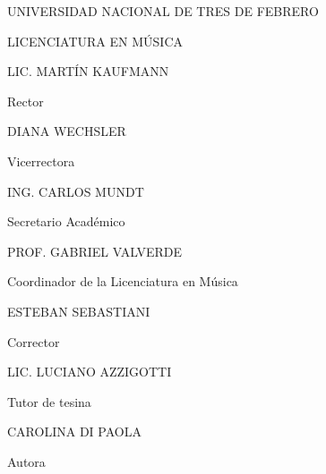 UNIVERSIDAD NACIONAL DE TRES DE FEBRERO 

LICENCIATURA EN MÚSICA 


LIC. MARTÍN KAUFMANN 

Rector 

DIANA WECHSLER 

Vicerrectora 

ING. CARLOS MUNDT 

Secretario Académico 

PROF. GABRIEL VALVERDE 

Coordinador de la Licenciatura en Música 

ESTEBAN SEBASTIANI 

Corrector 

LIC. LUCIANO AZZIGOTTI 

Tutor de tesina 

CAROLINA DI PAOLA 

Autora 
